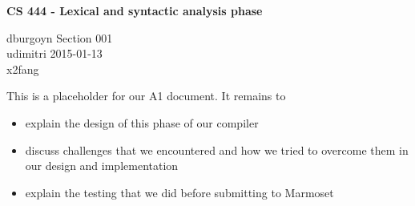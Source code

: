 \documentclass[12pt]{article}
\begin{document}
\begin{center}
\textbf{\large{}CS 444 - Lexical and syntactic analysis phase}
\end{center}

\begin{flushleft}
dburgoyn \textbf{\hfill{}} Section 001 \\
udimitri \textbf{\hfill{}} 2015-01-13 \\
x2fang \\
\end{flushleft}


This is a placeholder for our A1 document.  It remains to
\begin{itemize}
  \item explain the design of this phase of our compiler
  \item discuss challenges that we encountered and how we tried to overcome them in our design and implementation 
  \item explain the testing that we did before submitting to Marmoset
\end{itemize}
\end{document}
